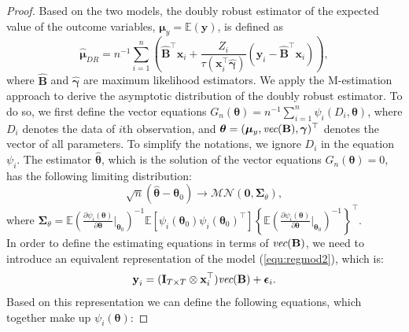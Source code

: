 \documentclass[12pt, A4]{article}
\newcommand{\SumOverN}{\sum_{i=1}^n}
\newcommand{\ObsRes}{\textbf{y}_i}
\newcommand{\ObsCov}{\textbf{x}_i}
\newcommand{\LogCoe}{\boldsymbol{\gamma}}
\newcommand{\vect}{\emph{vec}}
\newcommand{\IdenMat}{\textbf{I}}
\begin{document}
    \begin{proof}       
        Based on the two models, the doubly robust estimator of the expected value of the outcome variables, $\boldsymbol{\mu}_{y} = \mathbb{E}(\textbf{y})$, is defined as
            \begin{equation*}
                \hat{\boldsymbol{\mu}}_{DR} = n^{-1} \SumOverN \left( \hat{\textbf{B}}^{\top}\ObsCov + \frac{Z_i}{\tau(\ObsCov^{\top}\hat{\LogCoe})}(\ObsRes -\hat{\textbf{B}}^{\top}\ObsCov)  \right),
            \end{equation*}
        where $\hat{\textbf{B}}$ and $\hat{\LogCoe}$ are maximum likelihood estimators.
        We apply the M-estimation approach to derive the asymptotic distribution of the doubly robust estimator.
        To do so, we first define the vector equations $G_n(\boldsymbol{\theta}) = n^{-1}\SumOverN{\psi_i(D_i, \boldsymbol{\theta})}$, where $D_i$ denotes the data of $i$th observation, and $\boldsymbol{\theta} = (\boldsymbol{\mu}_y, \vect(\textbf{B}), \LogCoe)^{\top}$ denotes the vector of all parameters. 
        To simplify the notations, we ignore $D_i$ in the equation $\psi_i$.
        The estimator $\hat{\boldsymbol{\theta}}$, which is the solution of the vector equations $G_n(\boldsymbol{\theta}) = 0$, has the following limiting distribution: 
            \begin{equation*}
                \sqrt{n}(\hat{\boldsymbol{\theta}} - \boldsymbol{\theta}_0) \to \mathcal{MN}(\textbf{0}, \boldsymbol{\Sigma}_{\theta}),
            \end{equation*}
        where $\boldsymbol{\Sigma}_{\theta} = \mathbb{E} \left( \frac{\partial \psi_i(\boldsymbol{\theta})}{ \partial \boldsymbol{\theta}} \biggr\rvert_{\boldsymbol{\theta}_0} \right)^{-1} 
                    \mathbb{E} [ \psi_i(\boldsymbol{\theta}_0)\psi_i(\boldsymbol{\theta}_0)^{\top} ]
                    \left\{ \mathbb{E} \left( \frac{\partial \psi_i(\boldsymbol{\theta})}{ \partial \boldsymbol{\theta}} \biggr\rvert_{\boldsymbol{\theta}_0} \right)^{-1} \right\}^{\top}$. \\                
        In order to define the estimating equations in terms of $\vect(\textbf{B})$, we need to introduce an equivalent representation of the model (\ref{equ:regmod2}), which is:
            \begin{equation*}
                \ObsRes = (\IdenMat_{T \times T} \otimes \ObsCov^{\top})\vect(\textbf{B}) + \boldsymbol{\epsilon}_i.
            \end{equation*}
        Based on this representation we can define the following equations, which together make up $\psi_i(\boldsymbol{\theta})$:

\end{proof}
\end{document}

